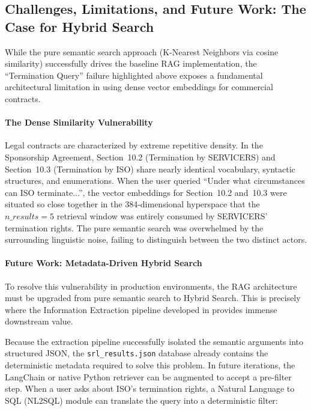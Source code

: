 \documentclass[twoside,final]{hcmut-report}
\newcommand{\result}[1]{\fcolorbox{red}{white}{#1}}
\begin{document}
\subsection{Challenges, Limitations, and Future Work: The Case for Hybrid Search}
\label{sec:limitations_hybrid_search}

While the pure semantic search approach (K-Nearest Neighbors via cosine similarity) successfully drives the baseline RAG implementation, the ``Termination Query'' failure highlighted above exposes a fundamental architectural limitation in using dense vector embeddings for commercial contracts.

\paragraph{The Dense Similarity Vulnerability}

Legal contracts are characterized by extreme repetitive density. In the Sponsorship Agreement, Section~10.2 (Termination by SERVICERS) and Section~10.3 (Termination by ISO) share nearly identical vocabulary, syntactic structures, and enumerations. When the user queried ``Under what circumstances can ISO terminate...'', the vector embeddings for Section~10.2 and~10.3 were situated so close together in the 384-dimensional hyperspace that the $n\_results=5$ retrieval window was entirely consumed by SERVICERS' termination rights. The pure semantic search was overwhelmed by the surrounding linguistic noise, failing to distinguish between the two distinct actors.

\paragraph{Future Work: Metadata-Driven Hybrid Search}
To resolve this vulnerability in production environments, the RAG architecture must be upgraded from pure semantic search to Hybrid Search. This is precisely where the Information Extraction pipeline developed in \result{Part~\ref{assignment_2}} provides immense downstream value.

\medskip

Because the extraction pipeline successfully isolated the semantic arguments into structured JSON, the \texttt{srl\_results.json} database already contains the deterministic metadata required to solve this problem. In future iterations, the LangChain or native Python retriever can be augmented to accept a pre-filter step. When a user asks about ISO's termination rights, a Natural Language to SQL (NL2SQL) module can translate the query into a deterministic filter:
\end{document}
